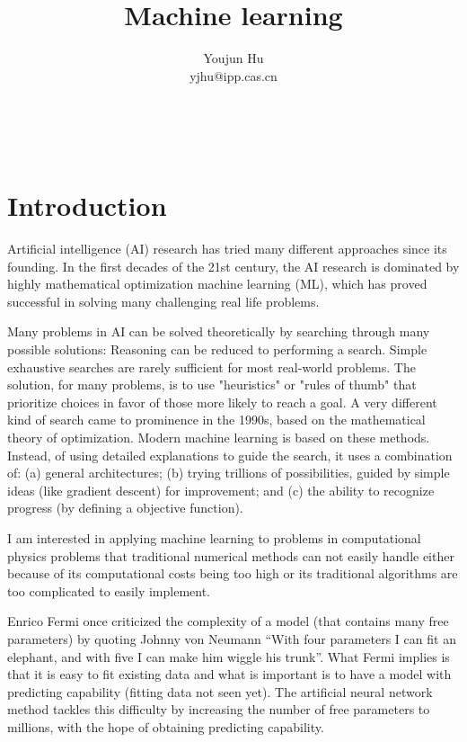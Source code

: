 \documentclass{article}
\newcommand{\tmaffiliation}[1]{\\ #1}
\begin{document}
\title{Machine learning}

\author{
  Youjun Hu
  \tmaffiliation{yjhu@ipp.cas.cn}
}

\maketitle

\

\section{Introduction}

Artificial intelligence (AI) research has tried many different approaches
since its founding. In the first decades of the 21st century, the AI research
is dominated by highly mathematical optimization machine learning (ML), which
has proved successful in solving many challenging real life problems.

Many problems in AI can be solved theoretically by searching through many
possible solutions: Reasoning can be reduced to performing a search. Simple
exhaustive searches are rarely sufficient for most real-world problems. The
solution, for many problems, is to use "heuristics" or "rules of thumb" that
prioritize choices in favor of those more likely to reach a goal. A very
different kind of search came to prominence in the 1990s, based on the
mathematical theory of optimization. Modern machine learning is based on these
methods. Instead, of using detailed explanations to guide the search, it uses
a combination of{\cite{nielsen2015neural}}: (a) general architectures; (b)
trying trillions of possibilities, guided by simple ideas (like gradient
descent) for improvement; and (c) the ability to recognize progress (by
defining a objective function).

I am interested in applying machine learning to problems in computational
physics problems that traditional numerical methods can not easily handle
either because of its computational costs being too high or its traditional
algorithms are too complicated to easily implement.

Enrico Fermi once criticized the complexity of a model (that contains many
free parameters) by quoting Johnny von Neumann ``With four parameters I can
fit an elephant, and with five I can make him wiggle his trunk''. What Fermi
implies is that it is easy to fit existing data and what is important is to
have a model with predicting capability (fitting data not seen yet). The
artificial neural network method tackles this difficulty by increasing the
number of free parameters to millions, with the hope of obtaining predicting
capability.
\end{document}
